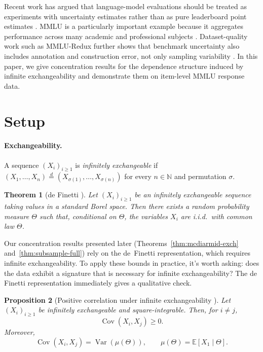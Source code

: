 \documentclass[11pt]{article}
\DeclareMathOperator{\Var}{Var}
\DeclareMathOperator{\Cov}{Cov}
\newcommand{\E}{\mathbb{E}}
\newtheorem{theorem}{Theorem}[section]
\newtheorem{proposition}[theorem]{Proposition}
\theoremstyle{definition}
\theoremstyle{remark}
\begin{document}
Recent work has argued that language-model evaluations should be treated as experiments with uncertainty estimates rather than as pure leaderboard point estimates \cite{miller2024adding, madaan2024quantifying}. MMLU is a particularly important example because it aggregates performance across many academic and professional subjects \cite{hendrycks2020measuring}. Dataset-quality work such as MMLU-Redux further shows that benchmark uncertainty also includes annotation and construction error, not only sampling variability \cite{gema2025we}. In this paper, we give concentration results for the dependence structure induced by infinite exchangeability and demonstrate them on item-level MMLU response data.

\section{Setup}\label{sec:setup}
\paragraph{Exchangeability.}
A sequence $(X_i)_{i \ge 1}$ is \emph{infinitely exchangeable} if
$(X_1,\ldots,X_n) \stackrel{d}{=} (X_{\sigma(1)},\ldots,X_{\sigma(n)})$
for every $n\in\mathbb N$ and permutation $\sigma$.

\begin{theorem}[de Finetti \citep{definetti1937}]
\label{thm:definetti}
Let \((X_i)_{i\ge1}\) be an infinitely exchangeable sequence taking values in a standard Borel space.  Then there exists a random probability measure \(\Theta\) such that, conditional on \(\Theta\), the variables \(X_i\) are i.i.d.\ with common law \(\Theta\).
\end{theorem}

Our concentration results presented later (Theorems~\ref{thm:mcdiarmid-exch} and~\ref{thm:subsample-full}) rely on the de~Finetti representation, which requires infinite exchangeability. To apply these bounds in practice, it's worth asking: does the data exhibit a signature that is necessary for infinite exchangeability? The de Finetti representation immediately gives a qualitative check.

\begin{proposition}[Positive correlation under infinite exchangeability \cite{aldous1985exchangeability}]\label{prop:positive-correlation}
Let $(X_i)_{i\ge1}$ be infinitely exchangeable and square-integrable.  Then, for $i\ne j$,
\[
    \Cov(X_i,X_j)\ge0.
\]
Moreover,
\[
    \Cov(X_i,X_j)=\Var(\mu(\Theta)),
    \qquad
    \mu(\Theta)=\E[X_1\mid\Theta].
\]
\end{proposition}
\end{document}
